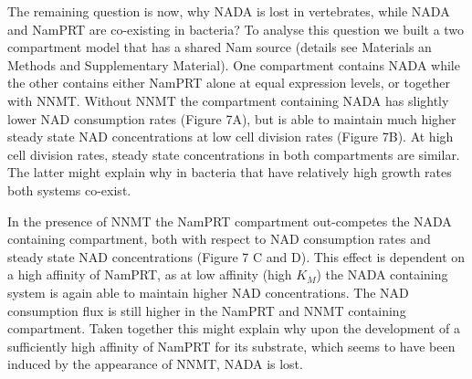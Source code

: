 The remaining question is now, why NADA is lost in vertebrates, while NADA and NamPRT are co-existing in bacteria? To analyse this question we built a two compartment model that has a shared Nam source (details see Materials an Methods and Supplementary Material). One compartment contains NADA while the other contains either NamPRT alone at equal expression levels, or together with NNMT. Without NNMT the compartment containing NADA has slightly lower NAD consumption rates (Figure 7A), but is able to maintain much higher steady state NAD concentrations at low cell division rates (Figure 7B). At high cell division rates, steady state concentrations in both compartments are similar. The latter might explain why in bacteria that have relatively high growth rates both systems co-exist.

In the presence of NNMT the NamPRT compartment out-competes the NADA containing compartment, both with respect to NAD consumption rates and steady state NAD concentrations (Figure 7 C and D). This effect is dependent on a high affinity of NamPRT, as at low affinity (high $K_{M}$) the NADA containing system is again able to maintain higher NAD concentrations. The NAD consumption flux is still higher in the NamPRT and NNMT containing compartment. Taken together this might explain why upon the development of a sufficiently high affinity of NamPRT for its substrate, which seems to have been induced by the appearance of NNMT, NADA is lost.


